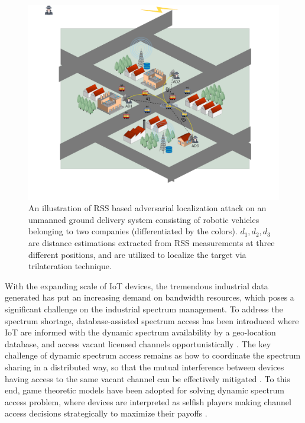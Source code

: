\begin{figure}[!t]
\centering
\includegraphics[scale=0.48]{./pic/Diagram22.pdf}
\caption{An illustration of RSS based adversarial localization attack on an unmanned ground delivery system consisting of robotic vehicles belonging to two companies (differentiated by the colors). $d_1, d_2, d_3$ are distance estimations extracted from RSS measurements at three different positions, and are utilized to localize the target via trilateration technique.}\label{fg:trilate}
\end{figure}

With the expanding scale of IoT devices, the tremendous industrial data generated has put an increasing demand on bandwidth resources, which poses a significant challenge on the industrial spectrum management. To address the spectrum shortage, database-assisted spectrum access has been introduced where IoT are informed with the dynamic spectrum availability by a geo-location database, and access vacant licensed channels opportunistically \cite{TII-dynamic, TII-game}. The key challenge of dynamic spectrum access remains as how to coordinate the spectrum sharing in a distributed way, so that the mutual interference between devices having access to the same vacant channel can be effectively mitigated \cite{TII-game}. To this end, game theoretic models have been adopted for solving dynamic spectrum access problem, where devices are interpreted as selfish players making channel access decisions strategically to maximize their payoffs \cite{wang2010game}. 


